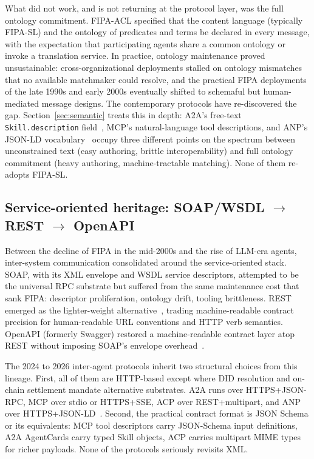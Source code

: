 What did not work, and is not returning at the protocol layer,
was the full ontology commitment. FIPA-ACL specified that the
content language (typically FIPA-SL) and the ontology of
predicates and terms be declared in every message, with the
expectation that participating agents share a common ontology
or invoke a translation service. In practice, ontology
maintenance proved unsustainable: cross-organizational
deployments stalled on ontology mismatches that no available
matchmaker could resolve, and the practical FIPA deployments of
the late 1990s and early 2000s eventually shifted to schemaful
but human-mediated message designs. The contemporary protocols
have re-discovered the gap. Section~\ref{sec:semantic} treats
this in depth: A2A's free-text \texttt{Skill.description}
field~\cite{spec_a2a}, MCP's natural-language tool descriptions,
and ANP's JSON-LD vocabulary~\cite{spec_anp} occupy three
different points on the spectrum between unconstrained text
(easy authoring, brittle interoperability) and full
ontology commitment (heavy authoring, machine-tractable
matching). None of them re-adopts FIPA-SL.

\subsection{Service-oriented heritage: SOAP/WSDL \(\rightarrow\) REST \(\rightarrow\) OpenAPI}
\label{sec:background:soa}

Between the decline of FIPA in the mid-2000s and the rise of
LLM-era agents, inter-system communication consolidated around
the service-oriented stack. SOAP, with its XML envelope and
WSDL service descriptors, attempted to be the universal RPC
substrate but suffered from the same maintenance cost that
sank FIPA: descriptor proliferation, ontology drift, tooling
brittleness. REST emerged as the lighter-weight
alternative~\cite{fielding2002rest}, trading machine-readable
contract precision for human-readable URL conventions and
HTTP verb semantics. OpenAPI (formerly
Swagger) restored a machine-readable contract layer atop REST
without imposing SOAP's envelope overhead~\cite{spec_openapi}.

The 2024 to 2026 inter-agent protocols inherit two structural
choices from this lineage. First, all of them are HTTP-based
except where DID resolution and on-chain settlement
mandate alternative substrates. A2A runs over HTTPS+JSON-RPC,
MCP over stdio or HTTPS+SSE, ACP over REST+multipart, and ANP
over HTTPS+JSON-LD~\cite{spec_a2a, spec_mcp, spec_acp,
spec_anp}. Second, the practical contract format is JSON
Schema or its equivalents: MCP tool descriptors carry
JSON-Schema input definitions, A2A AgentCards carry typed
Skill objects, ACP carries multipart MIME types for richer
payloads. None of the protocols seriously revisits XML.

